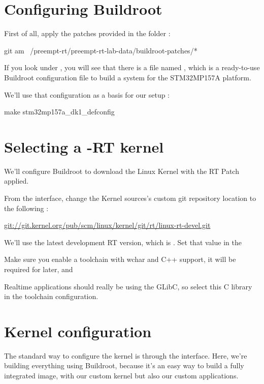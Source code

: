 \section{Configuring Buildroot}

First of all, apply the patches provided in the  folder :

\begin{bashinput}
	git am ~/preempt-rt/preempt-rt-lab-data/buildroot-patches/*
\end{bashinput}

If you look under , you will see that there is a file
named , which is a ready-to-use Buildroot
configuration file to build a system for the STM32MP157A platform.

We'll use that configuration as a basis for our setup :

\begin{bashinput}
make stm32mp157a_dk1_defconfig
\end{bashinput}

\section{Selecting a -RT kernel}

We'll configure Buildroot to download the Linux Kernel with the RT Patch applied.

From the  interface, change the Kernel sources's custom
git repository location to the following :

\url{git://git.kernel.org/pub/scm/linux/kernel/git/rt/linux-rt-devel.git}

We'll use the latest development RT version, which is . Set that
value in the 

Make sure you enable a toolchain with wchar and C++ support, it will be required
for later, and 

Realtime applications should really be using the GLibC, so select this C library in the
toolchain configuration.

\section{Kernel configuration}
The standard way to configure the kernel is through the  interface. Here, we're building everything using
Buildroot, because it's an easy way to build a fully integrated image, with our custom kernel but also our custom applications.


